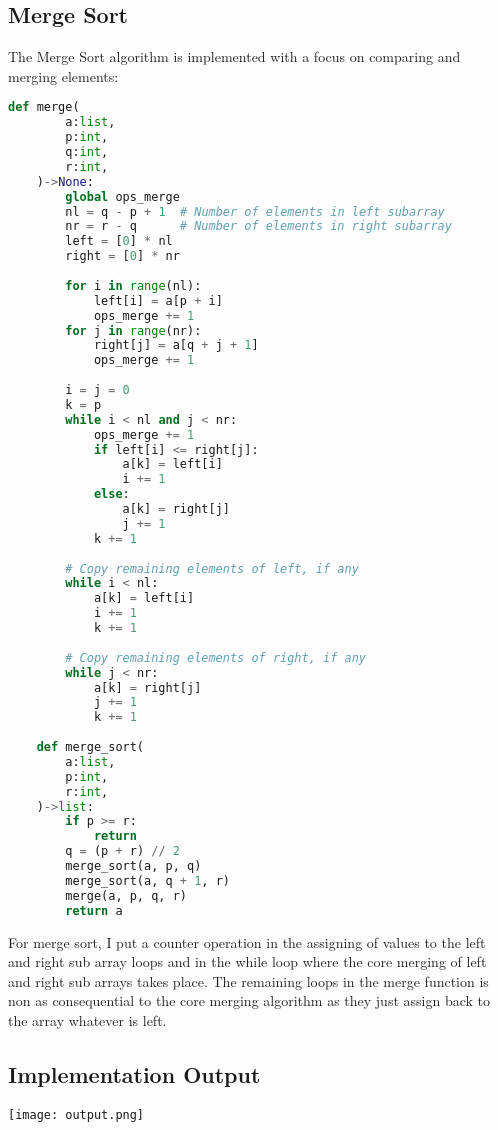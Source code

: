 \documentclass{article}
\begin{document}
\subsection{Merge Sort}
The Merge Sort algorithm is implemented with a focus on comparing and merging elements:
\begin{lstlisting}[language=Python]
    def merge(
        a:list, 
        p:int, 
        q:int, 
        r:int,
    )->None:
        global ops_merge
        nl = q - p + 1  # Number of elements in left subarray
        nr = r - q      # Number of elements in right subarray
        left = [0] * nl
        right = [0] * nr
    
        for i in range(nl):
            left[i] = a[p + i]
            ops_merge += 1
        for j in range(nr):
            right[j] = a[q + j + 1]
            ops_merge += 1
    
        i = j = 0
        k = p
        while i < nl and j < nr:
            ops_merge += 1
            if left[i] <= right[j]:
                a[k] = left[i]
                i += 1
            else:
                a[k] = right[j]
                j += 1
            k += 1
    
        # Copy remaining elements of left, if any
        while i < nl:
            a[k] = left[i]
            i += 1
            k += 1
    
        # Copy remaining elements of right, if any
        while j < nr:
            a[k] = right[j]
            j += 1
            k += 1
    
    def merge_sort(
        a:list, 
        p:int, 
        r:int,
    )->list:
        if p >= r:
            return
        q = (p + r) // 2
        merge_sort(a, p, q)
        merge_sort(a, q + 1, r)
        merge(a, p, q, r)
        return a
\end{lstlisting}

For merge sort, I put a counter operation in the assigning of values to the left and right sub array loops and in the while loop where the core merging of left and right sub arrays takes place. The remaining loops in the merge function is non as consequential to the core merging algorithm as they just assign back to the array whatever is left.

\subsection{Implementation Output}
\texttt{[image: output.png]}

\printbibliography
\end{document}
